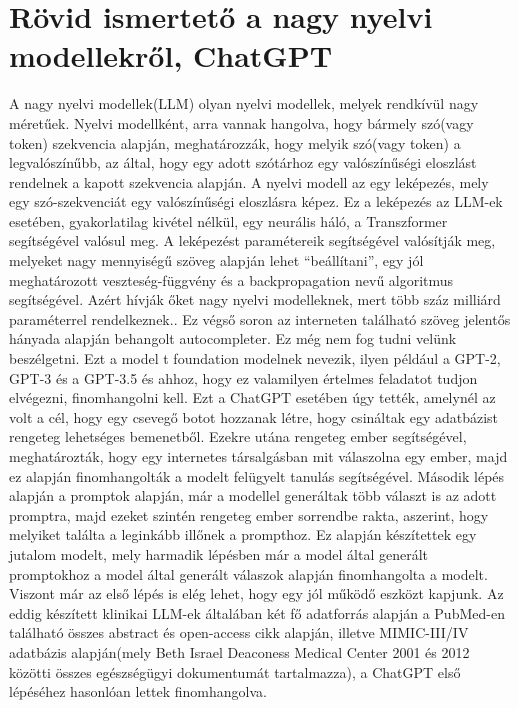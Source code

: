 \documentclass{article}
\begin{document}
\section{Rövid ismertető a nagy nyelvi modellekről, ChatGPT}
\begin{multicols}{2}
A nagy nyelvi modellek(LLM) olyan nyelvi modellek, melyek rendkívül nagy méretűek. Nyelvi modellként, arra vannak hangolva, hogy bármely szó(vagy token) szekvencia alapján, meghatározzák, hogy melyik szó(vagy token) a legvalószínűbb, az által, hogy egy adott szótárhoz egy valószínűségi eloszlást rendelnek a kapott szekvencia alapján. A nyelvi modell az egy leképezés, mely egy szó-szekvenciát egy valószínűségi eloszlásra képez. Ez a leképezés az LLM-ek esetében, gyakorlatilag kivétel nélkül, egy neurális háló, a Transzformer segítségével valósul meg. A leképezést paramétereik segítségével valósítják meg, melyeket nagy mennyiségű szöveg alapján lehet “beállítani”, egy jól meghatározott veszteség-függvény és a backpropagation nevű algoritmus segítségével. Azért hívják őket nagy nyelvi modelleknek, mert több száz milliárd paraméterrel rendelkeznek.. Ez végső soron az interneten található szöveg jelentős hányada alapján behangolt autocompleter. Ez még nem fog tudni velünk beszélgetni. Ezt a model t foundation modelnek nevezik, ilyen például a GPT-2, GPT-3 és a GPT-3.5 és ahhoz, hogy ez valamilyen értelmes feladatot tudjon elvégezni, finomhangolni kell. Ezt a ChatGPT esetében úgy tették, amelynél az volt a cél, hogy egy csevegő botot hozzanak létre, hogy csináltak egy adatbázist rengeteg lehetséges bemenetből. Ezekre utána rengeteg ember segítségével, meghatározták, hogy egy internetes társalgásban mit válaszolna egy ember, majd ez alapján finomhangolták a modelt felügyelt tanulás segítségével. Második lépés alapján a promptok alapján, már a modellel generáltak több választ is az adott promptra, majd ezeket szintén rengeteg ember sorrendbe rakta, aszerint, hogy melyiket találta a leginkább illőnek a prompthoz. Ez alapján készítettek egy jutalom modelt, mely harmadik lépésben már a model által generált promptokhoz a model által generált válaszok alapján finomhangolta a modelt. 
Viszont már az első lépés is elég lehet, hogy egy jól működő eszközt kapjunk. 
Az eddig készített klinikai LLM-ek általában két fő adatforrás alapján a PubMed-en található összes abstract és open-access cikk alapján, illetve MIMIC-III/IV adatbázis alapján(mely Beth Israel Deaconess Medical Center 2001 és 2012 közötti összes egészségügyi dokumentumát tartalmazza), a ChatGPT első lépéséhez hasonlóan lettek finomhangolva.
\end{multicols}
\end{document}
